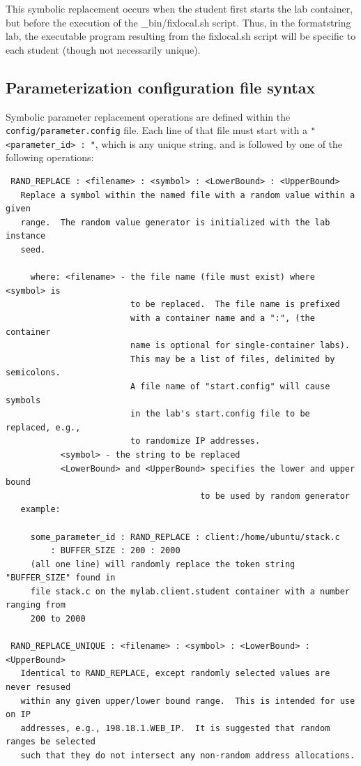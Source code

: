 \documentclass[12pt]{article}
\begin{document}
This symbolic replacement occurs when the student first starts the lab container,
but before the execution of the \_bin/fixlocal.sh script.  Thus, in the formatstring
lab, the executable program resulting from the fixlocal.sh script will be specific
to each student (though not necessarily unique).

\subsection{Parameterization configuration file syntax}
Symbolic parameter replacement operations are defined within the {\tt config/parameter.config} file.
Each line of that file must start with a \verb!"<parameter_id> : "!, which is any unique string, and
is followed by one of the following operations:

\begin{verbatim}
 RAND_REPLACE : <filename> : <symbol> : <LowerBound> : <UpperBound>
   Replace a symbol within the named file with a random value within a given
   range.  The random value generator is initialized with the lab instance
   seed.

     where: <filename> - the file name (file must exist) where <symbol> is 
                         to be replaced.  The file name is prefixed 
                         with a container name and a ":", (the container 
                         name is optional for single-container labs).  
                         This may be a list of files, delimited by semicolons. 
                         A file name of "start.config" will cause symbols
                         in the lab's start.config file to be replaced, e.g.,
                         to randomize IP addresses.
           <symbol> - the string to be replaced
           <LowerBound> and <UpperBound> specifies the lower and upper bound
                                       to be used by random generator
   example:

     some_parameter_id : RAND_REPLACE : client:/home/ubuntu/stack.c 
         : BUFFER_SIZE : 200 : 2000
     (all one line) will randomly replace the token string "BUFFER_SIZE" found in
     file stack.c on the mylab.client.student container with a number ranging from 
     200 to 2000

 RAND_REPLACE_UNIQUE : <filename> : <symbol> : <LowerBound> : <UpperBound>
   Identical to RAND_REPLACE, except randomly selected values are never resused
   within any given upper/lower bound range.  This is intended for use on IP
   addresses, e.g., 198.18.1.WEB_IP.  It is suggested that random ranges be selected
   such that they do not intersect any non-random address allocations.
 

\end{verbatim}
\end{document}
